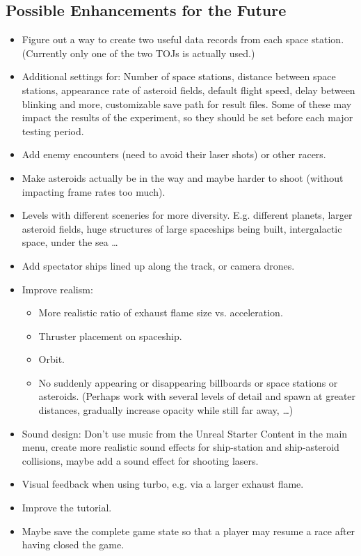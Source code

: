 \documentclass[11pt,a4paper]{article}
\begin{document}
        \subsection{Possible Enhancements for the Future}
        
        	\begin{itemize}
            	\item Figure out a way to create two useful data records from each space station. (Currently only one of the two TOJs is actually used.)
				\item Additional settings for: Number of space stations, distance between space stations, appearance rate of asteroid fields, default flight speed, delay between blinking and more, customizable save path for result files. Some of these may impact the results of the experiment, so they should be set before each major testing period.
				\item Add enemy encounters (need to avoid their laser shots) or other racers.
                \item Make asteroids actually be in the way and maybe harder to shoot (without impacting frame rates too much).
                \item Levels with different sceneries for more diversity. E.g. different planets, larger asteroid fields, huge structures of large spaceships being built, intergalactic space, under the sea \dots
                \item Add spectator ships lined up along the track, or camera drones.
                \item Improve realism:
                \begin{itemize}
                	\item More realistic ratio of exhaust flame size vs. acceleration.
                    \item Thruster placement on spaceship.
                    \item Orbit.
                    \item No suddenly appearing or disappearing billboards or space stations or asteroids. (Perhaps work with several levels of detail and spawn at greater distances, gradually increase opacity while still far away, \dots)
                \end{itemize}
                \item Sound design: Don't use music from the Unreal Starter Content in the main menu, create more realistic sound effects for ship-station and ship-asteroid collisions, maybe add a sound effect for shooting lasers.
                \item Visual feedback when using turbo, e.g. via a larger exhaust flame.
                \item Improve the tutorial.
                \item Maybe save the complete game state so that a player may resume a race after having closed the game.
            \end{itemize}
 
\end{document}
